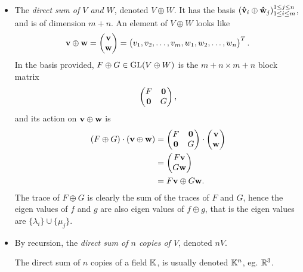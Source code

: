		\begin{itemize}
			\item The \emph{direct sum of $V$ and $W$}, denoted $V \oplus W$.
				\subitem It has the basis $(\mathbf{\hat{v}}_i \oplus \mathbf{\hat{w}}_j)_{1 \leq i \leq m}^{1 \leq j \leq n}$, and is of dimension $m+n$.
				\subitem An element of $V \oplus W$ looks like \begin{align*}
					\mathbf{v} \oplus \mathbf{w} = \begin{pmatrix}
						\mathbf{v} \\ \mathbf{w}
					\end{pmatrix} = \begin{pmatrix}
					v_1, v_2, \dots, v_m, w_1, w_2, \dots, w_n
					\end{pmatrix}^T.
				\end{align*}
				\subitem In the basis provided, $F \oplus G \in \text{GL}(V \oplus W)$ is the $m+n \times m+n$ block matrix 
				\begin{align*}
					\begin{pmatrix}
						F & \mathbf{0} \\ 
						\mathbf{0} & G
					\end{pmatrix},
				\end{align*}
				and its action on $\mathbf{v} \oplus \mathbf{w}$ is 
				\begin{align*}
					(F \oplus G ) \cdot (\mathbf{v}  \oplus \mathbf{w}) &= \begin{pmatrix}
						F & \mathbf{0} \\ 
						\mathbf{0} & G
					\end{pmatrix} \cdot \begin{pmatrix}
					\mathbf{v} \\ \mathbf{w}
					\end{pmatrix} \\ 
					&= \begin{pmatrix}
					F\mathbf{v} \\ G\mathbf{w}
					\end{pmatrix}  \\ 
					&= F\mathbf{v} \oplus G\mathbf{w}.
				\end{align*}
				\subitem The trace of $F \oplus G$ is clearly the sum of the traces of $F$ and $G$, hence the eigen values of $f$ and $g$ are also eigen values of $f \oplus g$, that is the eigen values are $\{\lambda_i\} \cup \{\mu_j\}$.
				
			\item By recursion, the \emph{direct sum of $n$ copies of $V$}, denoted $nV$.
				\subitem \begin{example}
					The direct sum of $n$ copies of a field $\mathbb{K}$, is usually denoted $\mathbb{K}^n$, eg. $\mathbb{R}^3$.
				\end{example}
				

\end{itemize}
